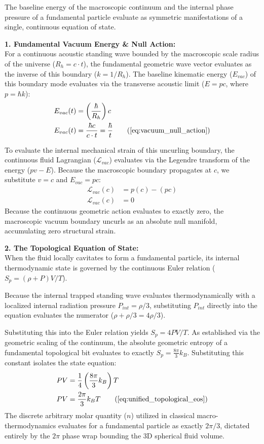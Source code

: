 \documentclass[11pt, a4paper]{article}
\begin{document}
The baseline energy of the macroscopic continuum and the internal phase pressure of a fundamental particle evaluate as symmetric manifestations of a single, continuous equation of state.

\textbf{1. Fundamental Vacuum Energy \& Null Action:} \\
For a continuous acoustic standing wave bounded by the macroscopic scale radius of the universe ($R_h = c \cdot t$), the fundamental geometric wave vector evaluates as the inverse of this boundary ($k = 1/R_h$). The baseline kinematic energy ($E_{vac}$) of this boundary mode evaluates via the transverse acoustic limit ($E = pc$, where $p = \hbar k$):
\begin{align}
    E_{vac}(t) &= \left( \frac{\hbar}{R_h} \right) c  \\
    E_{vac}(t) &= \frac{\hbar c}{c \cdot t} = \frac{\hbar}{t} \tag{\ref{eq:vacuum_null_action}}
\end{align}

To evaluate the internal mechanical strain of this uncurling boundary, the continuous fluid Lagrangian ($\mathcal{L}_{vac}$) evaluates via the Legendre transform of the energy ($pv - E$). Because the macroscopic boundary propagates at $c$, we substitute $v = c$ and $E_{vac} = pc$:
\begin{align}
    \mathcal{L}_{vac}(c) &= p(c) - (pc)  \\
    \mathcal{L}_{vac}(c) &= 0 
\end{align}
Because the continuous geometric action evaluates to exactly zero, the macroscopic vacuum boundary uncurls as an absolute null manifold, accumulating zero structural strain.

\textbf{2. The Topological Equation of State:} \\
When the fluid locally cavitates to form a fundamental particle, its internal thermodynamic state is governed by the continuous Euler relation ($S_p = (\rho + P)V / T$). 

Because the internal trapped standing wave evaluates thermodynamically with a localized internal radiation pressure $P_{int} = \rho/3$, substituting $P_{int}$ directly into the equation evaluates the numerator ($\rho + \rho/3 = 4\rho/3$).

Substituting this into the Euler relation yields $S_p = 4PV/T$. As established via the geometric scaling of the continuum, the absolute geometric entropy of a fundamental topological bit evaluates to exactly $S_p = \frac{8\pi}{3} k_B$. Substituting this constant isolates the state equation:
\begin{align}
    PV &= \frac{1}{4} \left( \frac{8\pi}{3} k_B \right) T  \\
    PV &= \frac{2\pi}{3} k_B T \tag{\ref{eq:unified_topological_eos}}
\end{align}
The discrete arbitrary molar quantity ($n$) utilized in classical macro-thermodynamics evaluates for a fundamental particle as exactly $2\pi/3$, dictated entirely by the $2\pi$ phase wrap bounding the 3D spherical fluid volume.
\end{document}
